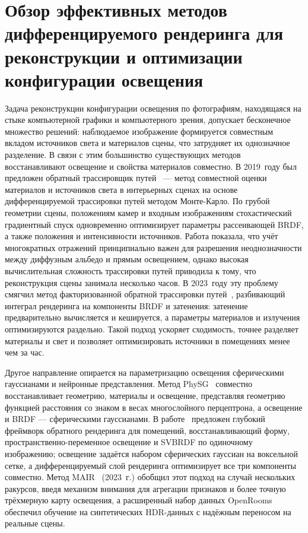 \chapter{Обзор эффективных методов дифференцируемого рендеринга для реконструкции и оптимизации конфигурации освещения}
\label{ch:light-review}

Задача реконструкции конфигурации освещения по фотографиям, находящаяся на стыке
компьютерной графики и компьютерного зрения, допускает бесконечное множество
решений: наблюдаемое изображение формируется совместным вкладом источников света
и материалов сцены, что затрудняет их однозначное разделение. В связи с этим
большинство существующих методов восстанавливают освещение и свойства материалов
совместно. В 2019~году был предложен обратный трассировщик
путей~\cite{Azinovic_2019_CVPR} --- метод совместной оценки материалов и
источников света в интерьерных сценах на основе дифференцируемой трассировки
путей методом Монте-Карло. По грубой геометрии сцены, положениям камер и входным
изображениям стохастический градиентный спуск одновременно оптимизирует
параметры рассеивающей BRDF, а также положения и интенсивности источников.
Работа показала, что учёт многократных отражений принципиально важен для
разрешения неоднозначности между диффузным альбедо и прямым освещением, однако
высокая вычислительная сложность трассировки путей приводила к тому, что
реконструкция сцены занимала несколько часов. В 2023~году эту проблему смягчил
метод факторизованной обратной трассировки путей~\cite{fipt2023}, разбивающий
интеграл рендеринга на компоненты BRDF и затенения: затенение предварительно
вычисляется и кешируется, а параметры материалов и излучения оптимизируются
раздельно. Такой подход ускоряет сходимость, точнее разделяет материалы и свет
и позволяет оптимизировать источники в помещениях менее чем за час.

Другое направление опирается на параметризацию освещения сферическими
гауссианами и нейронные представления. Метод PhySG~\cite{physg2021} совместно
восстанавливает геометрию, материалы и освещение, представляя геометрию функцией
расстояния со знаком в весах многослойного перцептрона, а освещение и BRDF ---
сферическими гауссианами. В работе~\cite{li2020inverse} предложен глубокий
фреймворк обратного рендеринга для помещений, восстанавливающий форму,
пространственно-переменное освещение и SVBRDF по одиночному изображению;
освещение задаётся набором сферических гауссиан на воксельной сетке, а
дифференцируемый слой рендеринга оптимизирует все три компоненты совместно.
Метод MAIR~\cite{Choi_2023_CVPR} (2023~г.) обобщил этот подход на случай
нескольких ракурсов, введя механизм внимания для агрегации признаков и более
точную трёхмерную карту освещения, а расширенный набор данных OpenRooms
обеспечил обучение на синтетических HDR-данных с надёжным переносом на реальные
сцены.

